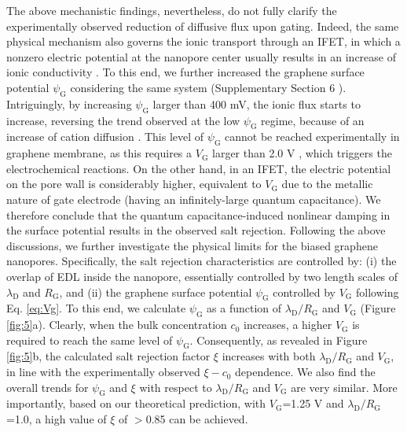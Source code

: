 \documentclass[manuscript=letter, email=true, hyperref=true, keywords=false]{achemso}
\begin{document}
The above mechanistic findings, nevertheless, do not fully clarify the
experimentally observed reduction of diffusive flux upon
gating. Indeed, the same physical mechanism also governs the ionic
transport through an IFET, in which a nonzero electric potential at
the nanopore center usually results in an increase of ionic
conductivity . To this end, we further increased the
graphene surface potential $\psi_{\mathrm{G}}$ considering the same
system (Supplementary Section 6 ). Intriguingly, by
increasing $\psi_{\mathrm{G}}$ larger than 400 mV, the ionic flux
starts to increase, reversing the trend observed at the low
$\psi_{\mathrm{G}}$ regime, because of an increase of cation diffusion
. This level of $\psi_{\mathrm{G}}$ cannot be reached
experimentally in graphene membrane, as this requires a
$V_{\mathrm{G}}$ larger than 2.0 V , which triggers the
electrochemical reactions. On the other hand, in an IFET, the electric
potential on the pore wall is considerably higher, equivalent to
$V_{\mathrm{G}}$ due to the metallic nature of gate electrode (having
an infinitely-large quantum capacitance). We therefore conclude that
the quantum capacitance-induced nonlinear damping in the surface
potential results in the observed salt rejection.  Following the above
discussions, we further investigate the physical limits for the biased
graphene nanopores. Specifically, the salt rejection characteristics
are controlled by: (i) the overlap of EDL inside the nanopore,
essentially controlled by two length scales of $\lambda_{\mathrm{D}}$
and $R_{\mathrm{G}}$, and (ii) the graphene surface potential
$\psi_{\mathrm{G}}$ controlled by $V_{\mathrm{G}}$ following
Eq. \ref{eq:Vg}. To this end, we calculate $\psi_{\mathrm{G}}$ as a
function of $\lambda_{\mathrm{D}} / R_{\mathrm{G}}$ and
$V_{\mathrm{G}}$ (Figure \ref{fig:5}a). Clearly, when the bulk
concentration $c_{0}$ increases, a higher $V_{\mathrm{G}}$ is required
to reach the same level of $\psi_{\mathrm{G}}$. Consequently, as
revealed in Figure \ref{fig:5}b, the calculated salt rejection factor
$\xi$ increases with both $\lambda_{\mathrm{D}} / R_{\mathrm{G}}$ and
$V_{\mathrm{G}}$, in line with the experimentally observed
$\xi - c_{0}$ dependence. We also find the overall trends for
$\psi_{\mathrm{G}}$ and $\xi$ with respect to
$\lambda_{\mathrm{D}}/R_{\mathrm{G}}$ and $V_{\mathrm{G}}$ are very
similar. More importantly, based on our theoretical prediction, with
$V_{\mathrm{G}}$=1.25 V and
$\lambda_{\mathrm{D}} / R_{\mathrm{G}}$=1.0, a high value of $\xi$ of
$>$0.85 can be achieved.
\end{document}
